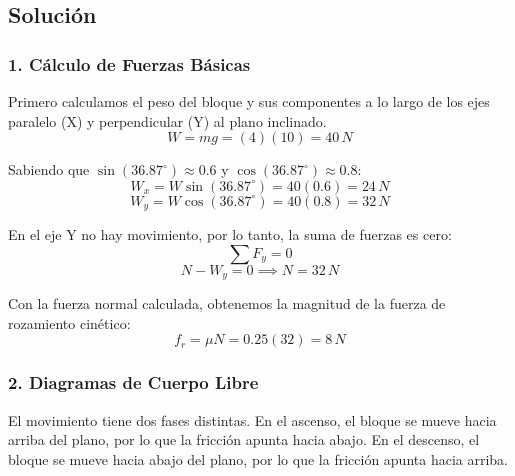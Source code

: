 \documentclass[12pt, a4paper]{article}
\begin{document}
\begin{center}
\end{center}

\subsection*{Solución}

\subsubsection*{1. Cálculo de Fuerzas Básicas}
Primero calculamos el peso del bloque y sus componentes a lo largo de los ejes paralelo (X) y perpendicular (Y) al plano inclinado.
$$ W = m g = (4)(10) = 40 \, \si{N} $$

Sabiendo que $\sin(36.87^\circ) \approx 0.6$ y $\cos(36.87^\circ) \approx 0.8$:
$$ W_x = W \sin(36.87^\circ) = 40(0.6) = 24 \, \si{N} $$
$$ W_y = W \cos(36.87^\circ) = 40(0.8) = 32 \, \si{N} $$

En el eje Y no hay movimiento, por lo tanto, la suma de fuerzas es cero:
$$ \sum F_y = 0 $$
$$ N - W_y = 0 \implies N = 32 \, \si{N} $$

Con la fuerza normal calculada, obtenemos la magnitud de la fuerza de rozamiento cinético:
$$ f_r = \mu N = 0.25(32) = 8 \, \si{N} $$

\subsubsection*{2. Diagramas de Cuerpo Libre}
El movimiento tiene dos fases distintas. En el ascenso, el bloque se mueve hacia arriba del plano, por lo que la fricción apunta hacia abajo. En el descenso, el bloque se mueve hacia abajo del plano, por lo que la fricción apunta hacia arriba.
\end{document}
